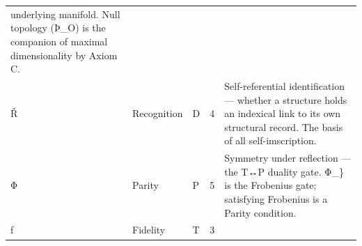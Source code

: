 \begin{longtable}[]{@{}lllll@{}}
\begin{minipage}[t]{0.27\columnwidth}
underlying manifold. Null topology (Þ\_O) is the companion of maximal
dimensionality by Axiom C.\strut
\end{minipage}\tabularnewline
\begin{minipage}[t]{0.14\columnwidth}\raggedright
Ř\strut
\end{minipage} & \begin{minipage}[t]{0.12\columnwidth}\raggedright
Recognition\strut
\end{minipage} & \begin{minipage}[t]{0.16\columnwidth}\raggedright
D\strut
\end{minipage} & \begin{minipage}[t]{0.16\columnwidth}\raggedright
4\strut
\end{minipage} & \begin{minipage}[t]{0.27\columnwidth}\raggedright
Self-referential identification --- whether a structure holds an
indexical link to its own structural record. The basis of all
self-imscription.\strut
\end{minipage}\tabularnewline
\begin{minipage}[t]{0.14\columnwidth}\raggedright
Φ\strut
\end{minipage} & \begin{minipage}[t]{0.12\columnwidth}\raggedright
Parity\strut
\end{minipage} & \begin{minipage}[t]{0.16\columnwidth}\raggedright
P\strut
\end{minipage} & \begin{minipage}[t]{0.16\columnwidth}\raggedright
5\strut
\end{minipage} & \begin{minipage}[t]{0.27\columnwidth}\raggedright
Symmetry under reflection --- the T↔P duality gate. Φ\_\} is the
Frobenius gate; satisfying Frobenius is a Parity condition.\strut
\end{minipage}\tabularnewline
\begin{minipage}[t]{0.14\columnwidth}\raggedright
ƒ\strut
\end{minipage} & \begin{minipage}[t]{0.12\columnwidth}\raggedright
Fidelity\strut
\end{minipage} & \begin{minipage}[t]{0.16\columnwidth}\raggedright
T\strut
\end{minipage} & \begin{minipage}[t]{0.16\columnwidth}\raggedright
3\strut

\end{minipage}
\end{longtable}
